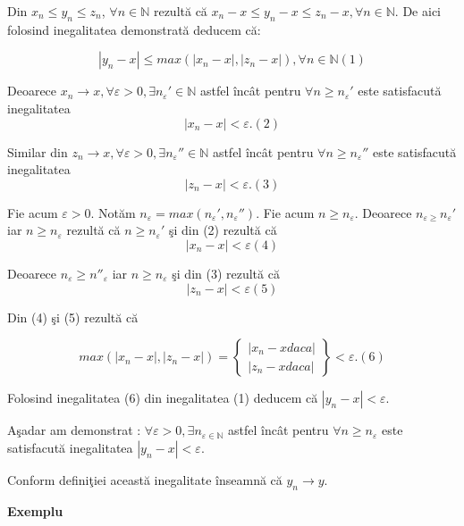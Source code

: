 \documentclass[a4paper,12pt,oneside]{report}
\begin{document}
Din \(x_{n} \leq y_{n}\leq z_{n}\), \(\forall n\in \mathbb{N} \) rezult\u a c\u a \(x_{n}-x \leq y_{n}-x \leq z_{n}-x, \forall n\in \mathbb{N}. \)
De aici folosind inegalitatea demonstrat\u a deducem c\u a:

\[\left | y_{n} - x \right |\leq max (\left | x_{n}-x \right |, \left | z_{n} - x \right |),\forall n\in \mathbb{N} (1)\]


Deoarece \(x_{n} \to x, \forall \varepsilon > 0, \exists {n_{\varepsilon }}'\in \mathbb{N}\) astfel \^ inc\^ at pentru \(\forall n \geq {n_{\varepsilon }}'\) este satisfacut\u a inegalitatea \[\left | x_{n}-x \right |< \varepsilon.(2) \]
	
Similar din \(z_{n} \to x, \forall \varepsilon > 0,\exists {n_{\varepsilon }}'' \in \mathbb{N}\) astfel \^ inc\^ at pentru \(\forall n\geq {n_{\varepsilon }}''\) este satisfacut\u a inegalitatea \[\left | z_{n} -x \right |< \varepsilon. (3)\]

Fie acum \(\varepsilon > 0.\) Not\u am \(n_{\varepsilon } = max ({n_{\varepsilon }}', {n_{\varepsilon }}'')\). Fie acum \(n\geq n_{\varepsilon }\). Deoarece \(n_{\varepsilon \geq }{n_{\varepsilon }}'\) iar \(n\geq n_{\varepsilon }\) rezult\u a c\u a \(n\geq {n_{\varepsilon }}'\) \c si din (2) rezult\u a c\u a \[\left | x_{n} - x \right |< \varepsilon (4) \]
	
Deoarece \(n_{\varepsilon }\geq {n}''_{\varepsilon }\) iar \(n\geq n_{\varepsilon}\) \c si din (3) rezult\u a c\u a  \[\left | z_{n}-x  \right |< \varepsilon (5)\]
	
Din (4) \c si (5) rezult\u a c\u a

\[ max(\left | x_{n} -x  \right |, \left | z_{n}-x \right |) = \begin{Bmatrix}
\left | x_{n}-x daca  \right |\\ 
\left | z_{n}-x daca  \right |
\end{Bmatrix} < \varepsilon.  (6) \]

Folosind inegalitatea (6) din inegalitatea (1) deducem c\u a \(\left | y_{n}-x  \right |< \varepsilon\).
 
A\c sadar am demonstrat : \(\forall \varepsilon > 0, \exists n_{\varepsilon \in \mathbb{N}}\) astfel \^ inc\^ at pentru \(\forall n\geq n_{\varepsilon }\) este satisfacut\u a inegalitatea \(\left | y_{n}-x \right |< \varepsilon.\) 

Conform defini\c tiei aceast\u a inegalitate \^ inseamn\u a c\u a \(y_{n} \to y.\) 

\textbf{Exemplu}
\end{document}
